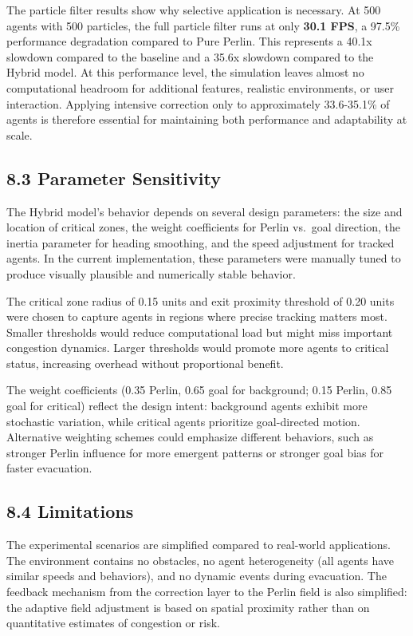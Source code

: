 \documentclass[
  11pt,
]{article}
\begin{document}
The particle filter results show why selective application is necessary.
At 500 agents with 500 particles, the full particle filter runs at only
\textbf{30.1 FPS}, a 97.5\% performance degradation compared to Pure
Perlin. This represents a 40.1x slowdown compared to the baseline and a
35.6x slowdown compared to the Hybrid model. At this performance level,
the simulation leaves almost no computational headroom for additional
features, realistic environments, or user interaction. Applying
intensive correction only to approximately 33.6-35.1\% of agents is
therefore essential for maintaining both performance and adaptability at
scale.

\subsection{8.3 Parameter Sensitivity}\label{parameter-sensitivity}

The Hybrid model's behavior depends on several design parameters: the
size and location of critical zones, the weight coefficients for Perlin
vs.~goal direction, the inertia parameter for heading smoothing, and the
speed adjustment for tracked agents. In the current implementation,
these parameters were manually tuned to produce visually plausible and
numerically stable behavior.

The critical zone radius of 0.15 units and exit proximity threshold of
0.20 units were chosen to capture agents in regions where precise
tracking matters most. Smaller thresholds would reduce computational
load but might miss important congestion dynamics. Larger thresholds
would promote more agents to critical status, increasing overhead
without proportional benefit.

The weight coefficients (0.35 Perlin, 0.65 goal for background; 0.15
Perlin, 0.85 goal for critical) reflect the design intent: background
agents exhibit more stochastic variation, while critical agents
prioritize goal-directed motion. Alternative weighting schemes could
emphasize different behaviors, such as stronger Perlin influence for
more emergent patterns or stronger goal bias for faster evacuation.

\subsection{8.4 Limitations}\label{limitations-2}

The experimental scenarios are simplified compared to real-world
applications. The environment contains no obstacles, no agent
heterogeneity (all agents have similar speeds and behaviors), and no
dynamic events during evacuation. The feedback mechanism from the
correction layer to the Perlin field is also simplified: the adaptive
field adjustment is based on spatial proximity rather than on
quantitative estimates of congestion or risk.
\end{document}
